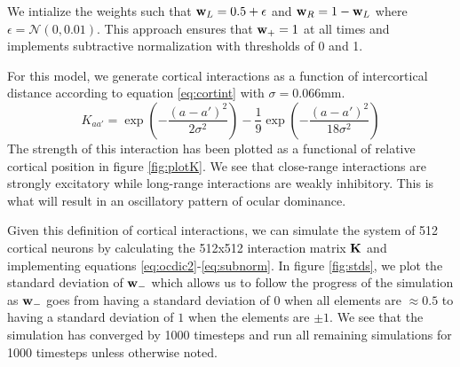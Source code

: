 \documentclass{article}
\begin{document}
We intialize the weights such that ${\bf w}_L = 0.5 + \epsilon$ and ${\bf w}_R = 1 - {\bf w}_L$ where $\epsilon =  \mathcal{N}(0, 0.01)$. This approach ensures that ${\bf w}_+ = 1$ at all times and implements subtractive normalization with thresholds of 0 and 1. %

For this model, we generate cortical interactions as a function of intercortical distance according to equation \ref{eq:cortint} with $\sigma = 0.066$mm.
\begin{equation}\label{eq:cortint}
K_{aa'} = \exp{(-\dfrac{(a-a')^2}{2\sigma^2})} - \dfrac{1}{9}\exp{(-\dfrac{(a-a')^2}{18\sigma^2})}
\end{equation}
The strength of this interaction has been plotted as a functional of relative cortical position in figure \ref{fig:plotK}. We see that close-range interactions are strongly excitatory while long-range interactions are weakly inhibitory. This is what will result  in an oscillatory pattern of ocular dominance.

Given this definition of cortical interactions, we can simulate the system of 512 cortical neurons by calculating the 512x512 interaction matrix $\bf K$ and implementing equations \ref{eq:ocdic2}-\ref{eq:subnorm}. In figure \ref{fig:stds}, we plot the standard deviation of ${\bf w}_-$ which allows us to follow the progress of the simulation as ${\bf w}_-$ goes from having a standard deviation of $0$ when all elements are $\approx 0.5$ to having a standard deviation of $1$ when the elements are $\pm 1$. We see that the simulation has converged by 1000 timesteps and run all remaining simulations for 1000 timesteps unless otherwise noted.
\end{document}
